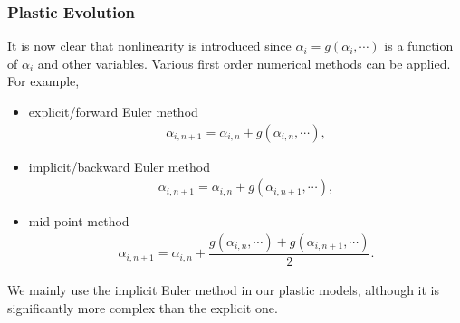 \subsubsection{Plastic Evolution}
It is now clear that nonlinearity is introduced since $\dot{\alpha_i}=g\left(\alpha_i,\cdots\right)$ is a function of $\alpha_i$ and other variables. Various first order numerical methods can be applied. For example,
\begin{itemize}
\item explicit/forward Euler method
\begin{gather}
\alpha_{i,n+1}=\alpha_{i,n}+g\left(\alpha_{i,n},\cdots\right),
\end{gather}
\item implicit/backward Euler method
\begin{gather}
\alpha_{i,n+1}=\alpha_{i,n}+g\left(\alpha_{i,n+1},\cdots\right),
\end{gather}
\item mid-point method
\begin{gather}
\alpha_{i,n+1}=\alpha_{i,n}+\dfrac{g\left(\alpha_{i,n},\cdots\right)+g\left(\alpha_{i,n+1},\cdots\right)}{2}.
\end{gather}
\end{itemize}

We mainly use the implicit Euler method in our plastic models, although it is significantly more complex than the explicit one.

